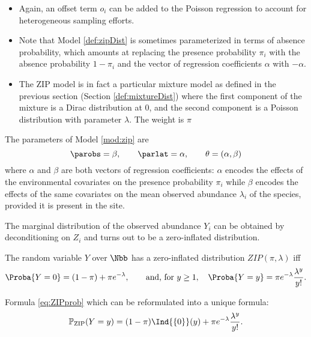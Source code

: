 \remarks
\begin{itemize}
	\item Again, an offset term $o_i$ can be added to the Poisson regression to account for heterogeneous sampling efforts. 
	\item 
	Note that Model \eqref{def:zipDist} is sometimes parameterized in terms of absence probability, which amounts at replacing the presence probability $\pi_i$ with the absence probability $1 - \pi_i$ and the vector of regression coefficients $\alpha$ with $-\alpha$.
	\item The ZIP model is in fact a particular mixture model as defined in the previous section (Section \ref{def:mixtureDist}) where
	the first component of the mixture is a Dirac distribution at $0$, and the second component is a Poisson distribution with parameter $\lambda$. The weight is $\pi$  
\end{itemize}
The parameters of Model \eqref{mod:zip} are
$$
\parobs = \beta, \quad \quad  \parlat = \alpha, \quad \quad \theta=(\alpha,\beta)
$$
where $\alpha$ and $\beta$ are both vectors of regression coefficients: $\alpha$ encodes the effects of the environmental covariates on the presence probability $\pi_i$ while $\beta$ encodes the effects of the same covariates on the mean observed abundance $\lambda_i$ of the species, provided it is present in the site.

The marginal distribution of the observed abundance $Y_i$ can be obtained by deconditioning on $Z_i$ and turns out to be a zero-inflated distribution.





\begin{definition} \label{def:zipDist}
  The random variable $Y$ over $\Nbb$ has a zero-inflated distribution $ZIP(\pi, \lambda)$ iff
  \begin{equation}\label{eq:ZIPprob} 
    \Proba{Y = 0}= (1 - \pi) + \pi e^{-\lambda}, 
  \qquad \text{and, for } y \geq 1, \quad
  \Proba{Y = y} = \pi e^{-\lambda} \frac{\lambda^y}{y!}.        
 \end{equation}
\end{definition}
Formula \eqref{eq:ZIPprob} which can be reformulated into a unique formula:
\begin{equation}\label{eq:ZIPprob2}
 \mathbb{P}_{\text{ZIP}}(Y=y) =(1 - \pi) \Ind{\{0\}}(y) + \pi e^{-\lambda} \frac{\lambda^y}{y!}. 
\end{equation}
  

